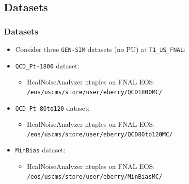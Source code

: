\documentclass[bigger]{beamer}
\begin{document}
\subsection{Datasets}
\label{sec-2-2}
\begin{frame}
\frametitle{Datasets}
\label{sec-2-2-1}
\begin{itemize}

\item Consider three \texttt{GEN-SIM} datasets (no PU) at \texttt{T1\_US\_FNAL}:\\
\label{sec-2-2-1-1}%

\item \texttt{QCD\_Pt-1800} dataset:
\label{sec-2-2-1-2}%
\begin{itemize}

\item HcalNoiseAnalyzer ntuples on FNAL EOS: \texttt{/eos/uscms/store/user/eberry/QCD1800MC/}
\label{sec-2-2-1-2-1}%
\end{itemize} %

\item \texttt{QCD\_Pt-80to120} dataset:
\label{sec-2-2-1-3}%
\begin{itemize}

\item HcalNoiseAnalyzer ntuples on FNAL EOS: \texttt{/eos/uscms/store/user/eberry/QCD80to120MC/}
\label{sec-2-2-1-3-1}%
\end{itemize} %

\item \texttt{MinBias} dataset:
\label{sec-2-2-1-4}%
\begin{itemize}

\item HcalNoiseAnalyzer ntuples on FNAL EOS: \texttt{/eos/uscms/store/user/eberry/MinBiasMC/}
\label{sec-2-2-1-4-1}%
\end{itemize} %
\end{itemize} %
\end{frame}
\end{document}
